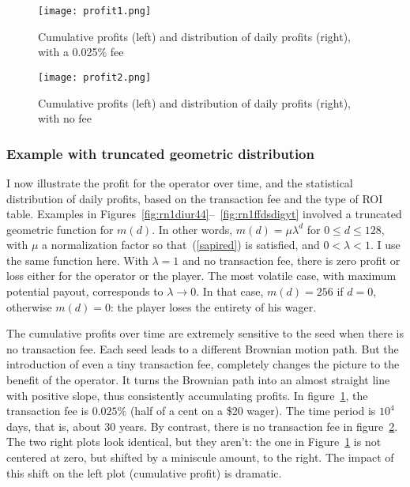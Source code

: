 \documentclass[oneside,10pt]{book}
\begin{document}
\begin{figure}[H]
\centering
\texttt{[image: profit1.png]}  
\caption{Cumulative profits (left) and distribution of daily profits (right), with a 0.025\% fee}
\label{fig:rn1dqprf1}
\end{figure}

\begin{figure}[H]
\centering
\texttt{[image: profit2.png]}  
\caption{Cumulative profits (left) and distribution of daily profits (right), with no fee}
\label{fig:rn1dqprf2}
\end{figure}

\subsubsection{Example with truncated geometric distribution}

I now illustrate the profit for the operator over time, and the statistical distribution of daily profits, based on the 
 transaction fee and the type of ROI table. Examples in Figures~\ref{fig:rn1diur44}--~\ref{fig:rn1ffdsdigyt} involved a truncated geometric function
 for $m(d)$. In other words, $m(d) = \mu \lambda^d$ for $0\leq d \leq 128$, with $\mu$ a normalization factor so 
that~(\ref{sapired}) is satisfied, and $0<\lambda < 1$. I use the same function here. With $\lambda = 1$ and no transaction fee, there is zero profit or loss either for the operator or the player. The most volatile case, with maximum potential payout, 
 corresponds to $\lambda\rightarrow 0$. In that case, $m(d)=256$ if $d=0$, otherwise $m(d)=0$: the player loses the entirety of 
his wager.  

The cumulative profits over time are extremely sensitive to the seed when there is no transaction fee. Each seed leads to a
 different \textcolor{index}{Brownian motion} path. But the introduction of even a tiny transaction fee, completely changes the picture to the benefit
 of the operator. It turns the Brownian path into an almost straight line with positive slope, thus consistently accumulating profits. 
In figure~\ref{fig:rn1dqprf1}, the transaction fee is $0.025\%$ (half of a cent on a \$20 wager). The time period is
 $10^4$ days, that is, about 30 years. By contrast, there is no transaction fee in figure~\ref{fig:rn1dqprf2}.
The two right plots look identical, but they aren't: the one in Figure~\ref{fig:rn1dqprf1} is not centered at zero, but shifted by a miniscule amount, to the right. The impact of this shift on the left plot (cumulative profit) is dramatic.
\end{document}

